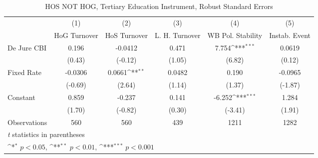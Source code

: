 \begin{table}[htbp]\centering
\def\sym#1{\ifmmode^{#1}\else\(^{#1}\)\fi}
\caption{HOS NOT HOG, Tertiary Education Instrument, Robust Standard Errors \label{NOhoshogIfivs}}
\begin{tabular}{l*{5}{c}}
\toprule
                                        &\multicolumn{1}{c}{(1)}&\multicolumn{1}{c}{(2)}&\multicolumn{1}{c}{(3)}&\multicolumn{1}{c}{(4)}&\multicolumn{1}{c}{(5)}\\
                                        &\multicolumn{1}{c}{HoG Turnover}&\multicolumn{1}{c}{HoS Turnover}&\multicolumn{1}{c}{L. H. Turnover}&\multicolumn{1}{c}{WB Pol. Stability}&\multicolumn{1}{c}{Instab. Event}\\
\midrule
De Jure CBI                             &    0.196         &  -0.0412         &    0.471         &    7.754\sym{***}&   0.0619         \\
                                        &   (0.43)         &  (-0.12)         &   (1.05)         &   (6.82)         &   (0.12)         \\
\addlinespace
Fixed Rate                              &  -0.0306         &   0.0661\sym{**} &   0.0482         &    0.190         &  -0.0965         \\
                                        &  (-0.69)         &   (2.64)         &   (1.14)         &   (1.37)         &  (-1.87)         \\
\addlinespace
Constant                                &    0.859         &   -0.237         &    0.141         &   -6.252\sym{***}&    1.284         \\
                                        &   (1.70)         &  (-0.82)         &   (0.30)         &  (-3.41)         &   (1.91)         \\
\midrule
Observations                            &      560         &      560         &      439         &     1211         &     1282         \\
\bottomrule
\multicolumn{6}{l}{\footnotesize \textit{t} statistics in parentheses}\\
\multicolumn{6}{l}{\footnotesize \sym{*} \(p<0.05\), \sym{**} \(p<0.01\), \sym{***} \(p<0.001\)}\\
\end{tabular}
\end{table}
